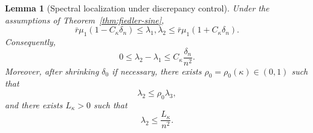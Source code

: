 \documentclass[11pt]{article}
\numberwithin{equation}{section}
\newtheorem{lemma}[theorem]{Lemma}
\theoremstyle{definition}
\theoremstyle{remark}
\begin{document}
\begin{lemma}[Spectral localization under discrepancy control]\label{lem:spectral-localization}
	Under the assumptions of Theorem~\ref{thm:fiedler-sine},
	\begin{equation}\label{eq:lambda12_localization}
		\bar r\mu_1(1-C_\kappa\delta_n)
		\le \lambda_1,\lambda_2
		\le \bar r\mu_1(1+C_\kappa\delta_n).
	\end{equation}
	Consequently,
	\begin{equation}\label{eq:gamma_small_delta}
		0\le \lambda_2-\lambda_1\le C_\kappa\frac{\delta_n}{n^2}.
	\end{equation}
	Moreover, after shrinking $\delta_0$ if necessary, there exists
	$\rho_0=\rho_0(\kappa)\in(0,1)$ such that
	\begin{equation}\label{eq:lambda2_lambda3_gap}
		\lambda_2\le \rho_0\lambda_3,
	\end{equation}
	and there exists $L_\kappa>0$ such that
	\begin{equation}\label{eq:lambda2_Lkappa}
		\lambda_2\le \frac{L_\kappa}{n^2}.
	\end{equation}
\end{lemma}
\end{document}
